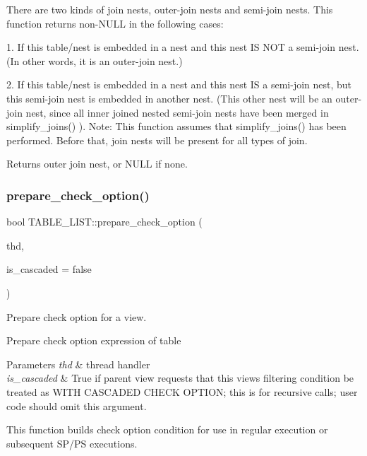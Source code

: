 There are two kinds of join nests, outer-\/join nests and semi-\/join nests. This function returns non-\/N\+U\+LL in the following cases\+: \begin{DoxyItemize}
\item 1. If this table/nest is embedded in a nest and this nest IS N\+OT a semi-\/join nest. (In other words, it is an outer-\/join nest.) \item 2. If this table/nest is embedded in a nest and this nest IS a semi-\/join nest, but this semi-\/join nest is embedded in another nest. (This other nest will be an outer-\/join nest, since all inner joined nested semi-\/join nests have been merged in {\ttfamily simplify\+\_\+joins()} ). Note\+: This function assumes that {\ttfamily simplify\+\_\+joins()} has been performed. Before that, join nests will be present for all types of join.\end{DoxyItemize}
\begin{DoxyReturn}{Returns}
outer join nest, or N\+U\+LL if none. 
\end{DoxyReturn}
\mbox{\label{structTABLE__LIST_ae517b6ba4f6be7fac92ad2914e154e05}} 
\subsubsection{\texorpdfstring{prepare\+\_\+check\+\_\+option()}{prepare\_check\_option()}}
{\footnotesize\ttfamily bool T\+A\+B\+L\+E\+\_\+\+L\+I\+S\+T\+::prepare\+\_\+check\+\_\+option (\begin{DoxyParamCaption}\item[{T\+HD $\ast$}]{thd,  }\item[{bool}]{is\+\_\+cascaded = {\ttfamily false} }\end{DoxyParamCaption})}



Prepare check option for a view. 

Prepare check option expression of table


\begin{DoxyParams}{Parameters}
{\em thd} & thread handler \\
\hline
{\em is\+\_\+cascaded} & True if parent view requests that this view\textquotesingle{}s filtering condition be treated as W\+I\+TH C\+A\+S\+C\+A\+D\+ED C\+H\+E\+CK O\+P\+T\+I\+ON; this is for recursive calls; user code should omit this argument.\\
\hline
\end{DoxyParams}
This function builds check option condition for use in regular execution or subsequent S\+P/\+PS executions.

